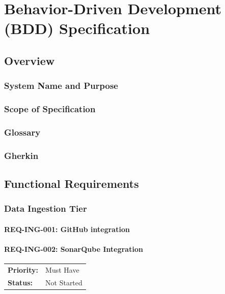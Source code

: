 \chapter{Behavior-Driven Development (BDD) Specification}
\label{app:bdd}

\section{Overview}

\subsection{System Name and Purpose}

\subsection{Scope of Specification}

\subsection{Glossary}

\subsection{Gherkin}

\section{Functional Requirements}

\subsection{Data Ingestion Tier}

\subsubsection{REQ-ING-001: GitHub integration}

\subsubsection{REQ-ING-002: SonarQube Integration}
\label{req:ing-002}

\begin{tabular}{@{}ll}
\textbf{Priority:} & Must Have \\
\textbf{Status:} & Not Started \\
\end{tabular}

